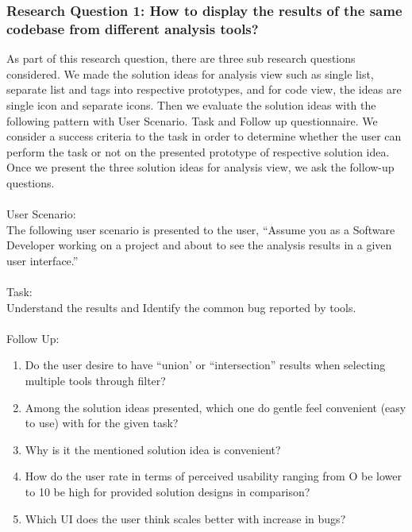 \subsubsection{Research Question 1: How to display the results of the same codebase from different analysis tools?}

As part of this research question, there are three sub research questions considered. We made the solution ideas for analysis view such as single list, separate list and tags into respective prototypes, and for code view, the ideas are single icon and separate icons. Then we evaluate the solution ideas with the following pattern with User Scenario. Task and Follow up questionnaire. We consider a success criteria to the task in order to determine whether the user can perform the task or not on the presented prototype of respective solution idea. Once we present the three solution ideas for analysis view, we ask the follow-up questions. \\ \\

User Scenario: \\

The following user scenario is presented to the user, “Assume you as a Software Developer working on a project and about to see the analysis results in a given user interface.” \\ \\

Task: \\

Understand the results and Identify the common bug reported by tools. \\ \\

Follow Up: \\

\begin{enumerate}
\item Do the user desire to have “union’ or “intersection” results when selecting multiple tools through filter? 
\item Among the solution ideas presented, which one do gentle feel convenient (easy to use) with for the given task?
\item Why is it the mentioned solution idea is convenient?
\item How do the user rate in terms of perceived usability ranging from O be lower to 10 be high for provided solution designs in comparison?
\item Which UI does the user think scales better with increase in bugs?
\end{enumerate}

